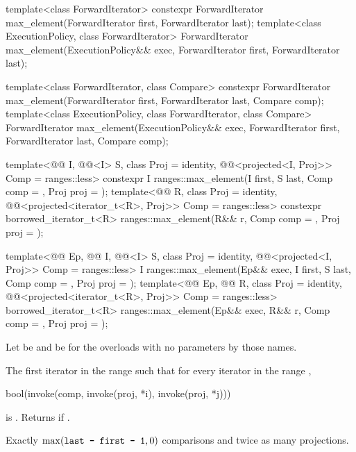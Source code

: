 %
\begin{itemdecl}
template<class ForwardIterator>
  constexpr ForwardIterator max_element(ForwardIterator first, ForwardIterator last);
template<class ExecutionPolicy, class ForwardIterator>
  ForwardIterator max_element(ExecutionPolicy&& exec,
                              ForwardIterator first, ForwardIterator last);

template<class ForwardIterator, class Compare>
  constexpr ForwardIterator max_element(ForwardIterator first, ForwardIterator last,
                                        Compare comp);
template<class ExecutionPolicy, class ForwardIterator, class Compare>
  ForwardIterator max_element(ExecutionPolicy&& exec,
                              ForwardIterator first, ForwardIterator last,
                              Compare comp);

template<@@ I, @@<I> S, class Proj = identity,
         @@<projected<I, Proj>> Comp = ranges::less>
  constexpr I ranges::max_element(I first, S last, Comp comp = {}, Proj proj = {});
template<@@ R, class Proj = identity,
         @@<projected<iterator_t<R>, Proj>> Comp = ranges::less>
  constexpr borrowed_iterator_t<R>
    ranges::max_element(R&& r, Comp comp = {}, Proj proj = {});

template<@@ Ep, @@ I, @@<I> S,
         class Proj = identity,
         @@<projected<I, Proj>> Comp = ranges::less>
  I ranges::max_element(Ep&& exec, I first, S last, Comp comp = {}, Proj proj = {});
template<@@ Ep, @@ R,
         class Proj = identity,
         @@<projected<iterator_t<R>, Proj>> Comp = ranges::less>
  borrowed_iterator_t<R>
    ranges::max_element(Ep&& exec, R&& r, Comp comp = {}, Proj proj = {});
\end{itemdecl}

\begin{itemdescr}
\pnum
Let  be 
and  be 
for the overloads with no parameters by those names.

\pnum
\returns
The first iterator  in the range 
such that for every iterator  in the range ,
\begin{codeblock}
bool(invoke(comp, invoke(proj, *i), invoke(proj, *j)))
\end{codeblock}
is .
Returns  if .

\pnum
\complexity
Exactly $\max(\tcode{last - first - 1}, 0)$ comparisons and
twice as many projections.
\end{itemdescr}

